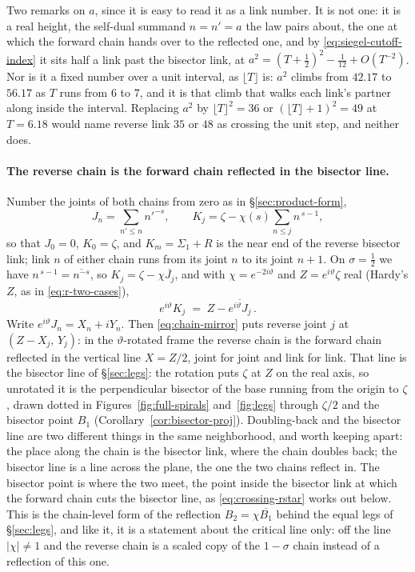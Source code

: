 \documentclass[11pt]{article}
\theoremstyle{definition}
\begin{document}
Two remarks on $a$, since it is easy to read it as a link number. It is not one:
it is a real height, the self-dual summand $n=n'=a$ the law pairs about, the
one at which the forward chain hands over to the reflected one, and by
\eqref{eq:siegel-cutoff-index} it sits half a link past the bisector link, at $a^{2}=(T+\tfrac12)^{2}-\tfrac1{12}+O(T^{-2})$. Nor is it
a fixed number over a unit interval, as $\lfloor T\rfloor$ is: $a^{2}$ climbs
from $42.17$ to $56.17$ as $T$ runs from $6$ to $7$, and it is that climb that
walks each link's partner along inside the interval. Replacing $a^{2}$ by
$\lfloor T\rfloor^{2}=36$ or $(\lfloor T\rfloor+1)^{2}=49$ at $T=6.18$ would
name reverse link $35$ or $48$ as crossing the unit step, and neither does.

\paragraph{The reverse chain is the forward chain reflected in the bisector line.} Number the joints
of both chains from zero as in \S\ref{sec:product-form},
\begin{equation}\label{eq:crossing-joints}
J_n=\sum_{n'\leq n}n'^{-s},
\qquad
K_j=\zeta-\chi(s)\sum_{n\leq j}n^{\,s-1},
\end{equation}
so that $J_0=0$, $K_0=\zeta$, and $K_m=\Sigma_1+R$ is the near end of the
reverse bisector link; link $n$ of either chain runs from its joint $n$ to its
joint $n+1$. On $\sigma=\tfrac12$ we have $n^{\,s-1}=\overline{n^{-s}}$, so
$K_j=\zeta-\chi\overline{J_j}$, and with $\chi=e^{-2i\vartheta}$ and
$Z=e^{i\vartheta}\zeta$ real (Hardy's $Z$, as in \eqref{eq:r-two-cases}),
\begin{equation}\label{eq:chain-mirror}
e^{i\vartheta}K_j \;=\; Z-\overline{e^{i\vartheta}J_j}\,.
\end{equation}
Write $e^{i\vartheta}J_n=X_n+iY_n$. Then \eqref{eq:chain-mirror} puts reverse
joint $j$ at $(Z-X_j,\,Y_j)$: in the $\vartheta$-rotated frame the reverse chain
is the forward chain reflected in the vertical line $X=Z/2$, joint for joint and
link for link. That line is the bisector line of \S\ref{sec:legs}: the
rotation puts $\zeta$ at $Z$ on the real axis, so unrotated it is the
perpendicular bisector of the base running from the origin to $\zeta$, drawn
dotted in
Figures~\ref{fig:full-spirals} and~\ref{fig:legs} through $\zeta/2$ and the
bisector point $B_1$ (Corollary~\ref{cor:bisector-proj}). Doubling-back and the
bisector line are
two different things in the same neighborhood, and worth keeping apart: the
place along the chain is the bisector link, where the chain doubles
back; the bisector line is a line across the plane, the one the two chains
reflect in. The bisector point is where the two meet, the point inside the
bisector link at which the forward chain cuts the bisector line, as
\eqref{eq:crossing-rstar} works out below. This is the
chain-level form of the reflection
$B_2=\chi\overline{B_1}$ behind the equal legs of \S\ref{sec:legs}, and like it,
it is a statement about the critical line only: off the line $|\chi|\neq1$ and
the reverse chain is a scaled copy of the $1-\sigma$ chain instead of a
reflection of this one.
\end{document}
